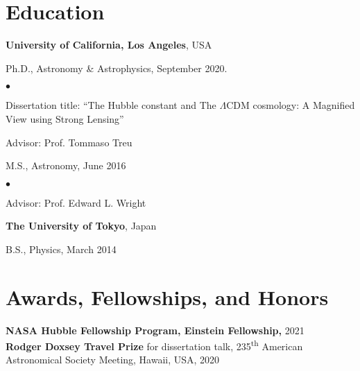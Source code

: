 \documentclass[margin, line]{res}
\newenvironment{list1}{
  \begin{list}{\ding{113}}{%
      \setlength{\itemsep}{0in}
      \setlength{\parsep}{0in} \setlength{\parskip}{0in}
      \setlength{\topsep}{0in} \setlength{\partopsep}{0in} 
      \setlength{\leftmargin}{0.17in}}}{\end{list}}
\newenvironment{list2}{
  \begin{list}{$\bullet$}{%
      \setlength{\itemsep}{0in}
      \setlength{\parsep}{0in} \setlength{\parskip}{0in}
      \setlength{\topsep}{0in} \setlength{\partopsep}{0in} 
      \setlength{\leftmargin}{0.2in}}}{\end{list}}
\begin{document}
\begin{resume}
\vspace*{-.05in}


\section{\sc Education}
{\bf University of California, Los Angeles}, USA\\
\vspace*{-.1in}
\begin{list1}
	\item[] Ph.D., Astronomy \& Astrophysics, September 2020.
	\begin{list2}
		\vspace*{.05in}
		\item Dissertation title:  ``The Hubble constant and The $\Lambda$CDM cosmology: A Magnified View using Strong Lensing'' 
		\item Advisor:  Prof. Tommaso Treu
	\end{list2}
\end{list1}
\vspace*{.05in}

\begin{list1}
	\item[] M.S., Astronomy,  June 2016
	\begin{list2}
		\vspace*{.05in} 
		\item Advisor:  Prof. Edward L. Wright
	\end{list2}
\end{list1}

{\bf The University of Tokyo}, Japan\\
\vspace*{-.1in}
\begin{list1}
\item[] B.S., Physics,  March 2014
\end{list1}



\section{\sc Awards, Fellowships, and Honors}
\textbf{NASA Hubble Fellowship Program, Einstein Fellowship,} 2021 \\
\textbf{Rodger Doxsey Travel Prize} for dissertation talk, 235\textsuperscript{th} American Astronomical Society Meeting, Hawaii, USA, 2020 


\end{resume}
\end{document}
